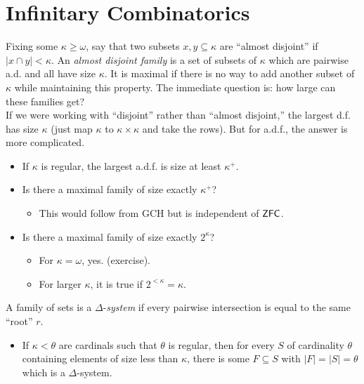 \documentclass{amsart}
\DeclareMathOperator{\ZFC}{\sf{ZFC}}
\begin{document}
	\newpage 
	
	\section{Infinitary Combinatorics}
	
	Fixing some $\kappa \geq \omega$, say that two subsets $x,y\subseteq \kappa$ are ``almost disjoint'' if $|x\cap y|<\kappa$. An \textit{almost disjoint family} is a set of subsets of $\kappa$ which are pairwise a.d. and all have size $\kappa$. It is maximal if there is no way to add another subset of $\kappa$ while maintaining this property. The immediate question is: how large can these families get?\\
	
	If we were working with ``disjoint'' rather than ``almost disjoint,'' the largest d.f. has size $\kappa$ (just map $\kappa$ to $\kappa\times \kappa$ and take the rows). But for a.d.f., the answer is more complicated.\\
	
	\begin{itemize}
		\item If $\kappa$ is regular, the largest a.d.f. is size at least $\kappa^+$.
		\item Is there a maximal family of size exactly $\kappa^+$?
		\begin{itemize}
			\item This would follow from GCH but is independent of $\ZFC$.
		\end{itemize} 
		\item Is there a maximal family of size exactly $2^{\kappa}$?
		\begin{itemize}
			\item For $\kappa=\omega$, yes. (exercise).
			\item For larger $\kappa$, it is true if $2^{<\kappa}=\kappa$.\\
		\end{itemize}
	\end{itemize}
	
	A family of sets is a $\Delta$-\textit{system} if every pairwise intersection is equal to the same ``root'' $r$.\\
	
	\begin{itemize}
		\item If $\kappa <\theta$ are cardinals such that $\theta$ is regular, then for every $S$ of cardinality $\theta$ containing elements of size less than $\kappa$, there is some $F\subseteq S$ with $|F|=|S|=\theta$ which is a $\Delta$-system.\\
	\end{itemize}
	
\end{document}

